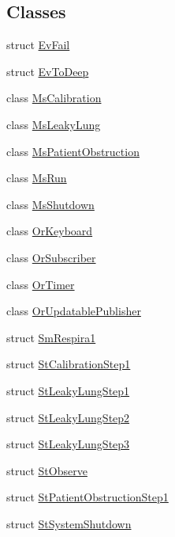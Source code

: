 \subsection*{Classes}
\begin{DoxyCompactItemize}
\item 
struct \hyperlink{structsm__respira__1_1_1EvFail}{Ev\+Fail}
\item 
struct \hyperlink{structsm__respira__1_1_1EvToDeep}{Ev\+To\+Deep}
\item 
class \hyperlink{classsm__respira__1_1_1MsCalibration}{Ms\+Calibration}
\item 
class \hyperlink{classsm__respira__1_1_1MsLeakyLung}{Ms\+Leaky\+Lung}
\item 
class \hyperlink{classsm__respira__1_1_1MsPatientObstruction}{Ms\+Patient\+Obstruction}
\item 
class \hyperlink{classsm__respira__1_1_1MsRun}{Ms\+Run}
\item 
class \hyperlink{classsm__respira__1_1_1MsShutdown}{Ms\+Shutdown}
\item 
class \hyperlink{classsm__respira__1_1_1OrKeyboard}{Or\+Keyboard}
\item 
class \hyperlink{classsm__respira__1_1_1OrSubscriber}{Or\+Subscriber}
\item 
class \hyperlink{classsm__respira__1_1_1OrTimer}{Or\+Timer}
\item 
class \hyperlink{classsm__respira__1_1_1OrUpdatablePublisher}{Or\+Updatable\+Publisher}
\item 
struct \hyperlink{structsm__respira__1_1_1SmRespira1}{Sm\+Respira1}
\item 
struct \hyperlink{structsm__respira__1_1_1StCalibrationStep1}{St\+Calibration\+Step1}
\item 
struct \hyperlink{structsm__respira__1_1_1StLeakyLungStep1}{St\+Leaky\+Lung\+Step1}
\item 
struct \hyperlink{structsm__respira__1_1_1StLeakyLungStep2}{St\+Leaky\+Lung\+Step2}
\item 
struct \hyperlink{structsm__respira__1_1_1StLeakyLungStep3}{St\+Leaky\+Lung\+Step3}
\item 
struct \hyperlink{structsm__respira__1_1_1StObserve}{St\+Observe}
\item 
struct \hyperlink{structsm__respira__1_1_1StPatientObstructionStep1}{St\+Patient\+Obstruction\+Step1}
\item 
struct \hyperlink{structsm__respira__1_1_1StSystemShutdown}{St\+System\+Shutdown}
\end{DoxyCompactItemize}
